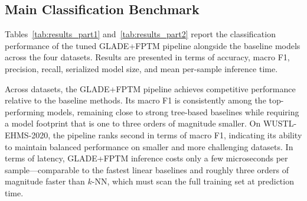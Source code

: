 \documentclass[journal,twoside,web]{ieeecolor}
\begin{document}
\subsection{Main Classification Benchmark}
\label{sec:res-main}

Tables~\ref{tab:results_part1} and~\ref{tab:results_part2} report the
classification performance of the tuned GLADE+FPTM pipeline alongside
the baseline models across the four datasets. Results are presented in
terms of accuracy, macro F1, precision, recall, serialized model size,
and mean per-sample inference time.

Across datasets, the GLADE+FPTM pipeline achieves competitive
performance relative to the baseline methods. Its macro F1 is
consistently among the top-performing models, remaining close to
strong tree-based baselines while requiring a model footprint that is
one to three orders of magnitude smaller. On WUSTL-EHMS-2020, the
pipeline ranks second in terms of macro F1, indicating its ability
to maintain balanced performance on smaller and more challenging
datasets. In terms of latency, GLADE+FPTM inference costs only a few
microseconds per sample---comparable to the fastest linear baselines
and roughly three orders of magnitude faster than $k$-NN, which must
scan the full training set at prediction time.
\end{document}
